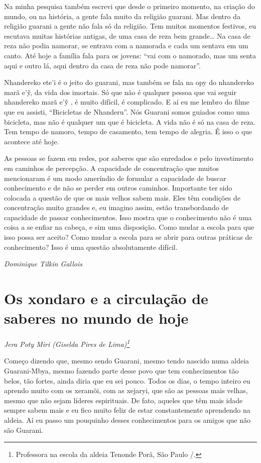 Na minha pesquisa também escrevi que desde o primeiro momento, na
criação do mundo, ou na história, a gente fala muito da religião
guarani. Mas dentro da religião guarani a gente não fala só da
religião. Tem muitos momentos festivos, eu escutava muitas histórias
antigas, de uma casa de reza bem grande\ldots{} Na casa de reza não podia
namorar, se entrava com a namorada e cada um sentava em um canto. Até
hoje a família fala para os jovens: ``vai com o namorado, mas um senta
aqui e outro lá, aqui dentro da casa de reza não pode namorar''.

Nhandereko ete’i é o jeito do guarani, mas também se fala na opy do
nhandereko marã e’\~{y}, da vida dos imortais. Só que não é qualquer
pessoa que vai seguir nhandereko marã e’\~{y} , é muito difícil, é
complicado. E aí eu me lembro do filme que eu assisti, ``Bicicletas de
Nhanderu''. Nós Guarani somos guiados como uma bicicleta, mas não é
qualquer um que é bicicleta. A vida não é só na casa de reza. Tem tempo
de namoro, tempo de casamento, tem tempo de alegria. É isso o que
acontece até hoje.

As pessoas se fazem em redes, por saberes que são enredados e pelo
investimento em caminhos de percepção. A capacidade de concentração que
muitos mencionaram é um modo ameríndio de formular a capacidade de
buscar conhecimento e de não se perder em outros caminhos. Importante
ter sido colocada a questão de que os mais velhos sabem mais. Eles têm
condições de concentração muito grandes e, eu imagino assim, estão
transbordando de capacidade de passar conhecimentos. Isso mostra que o
conhecimento não é uma coisa a se enfiar na cabeça, e sim uma
disposição. Como mudar a escola para que isso possa ser aceito? Como
mudar a escola para se abrir para outras práticas de conhecimento? Isso
é uma questão absolutamente difícil.
\bigskip
\begin{flushright}
\emph{Dominique Tilkin Gallois}
\end{flushright}


\chapter{Os xondaro e a circulação de saberes no mundo de hoje}
\begin{flushright}
\emph{Jera Poty Miri (Giselda Pires de Lima)\footnote{Professora na escola da aldeia Tenonde Porã, São Paulo /.}}
\end{flushright}  

Começo dizendo que, mesmo sendo Guarani, mesmo tendo nascido numa aldeia
Guarani-Mbya, mesmo fazendo parte desse povo que tem conhecimentos tão
belos, tão fortes, ainda diria que eu sei pouco. Todos os dias, o tempo
inteiro eu aprendo muito com os xeramõi, com as xejaryi, que são as
pessoas mais velhas, mesmo que não sejam líderes espirituais. De fato,
aqueles que têm mais idade sempre sabem mais e eu fico muito feliz de
estar constantemente aprendendo na aldeia. Aí eu passo um pouquinho
desses conhecimentos para os amigos que não são Guarani.


